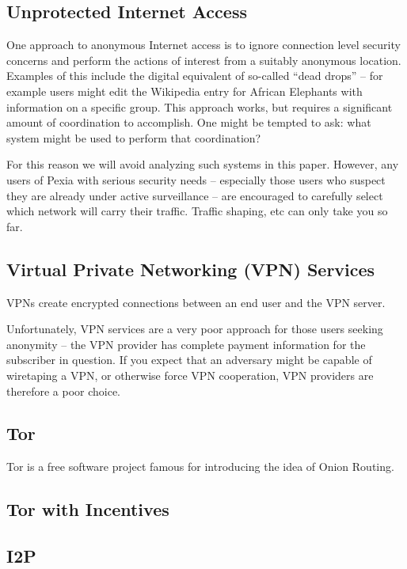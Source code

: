 \documentclass{article}
\newcommand{\mesh}{Pexia}
\begin{document}
\subsection{Unprotected Internet Access}

One approach to anonymous Internet access is to ignore connection level security concerns and perform the actions of interest from a suitably anonymous location. Examples of this include the digital equivalent of so-called “dead drops” – for example users might edit the Wikipedia entry for African Elephants with information on a specific group. This approach works, but requires a significant amount of coordination to accomplish. One might be tempted to ask: what system might be used to perform that coordination?

For this reason we will avoid analyzing such systems in this paper. However, any users of \mesh{} with serious security needs – especially those users who suspect they are already under active surveillance – are encouraged to carefully select which network will carry their traffic. Traffic shaping, etc can only take you so far.

\subsection{Virtual Private Networking (VPN) Services}

VPNs create encrypted connections between an end user and the VPN server.

Unfortunately, VPN services are a very poor approach for those users seeking anonymity – the VPN provider has complete payment information for the subscriber in question. If you expect that an adversary might be capable of wiretaping a VPN, or otherwise force VPN cooperation, VPN providers are therefore a poor choice.

\subsection{Tor}

Tor is a free software project famous for introducing the idea of Onion Routing.

\subsection{Tor with Incentives}

\subsection{I2P}
\end{document}
